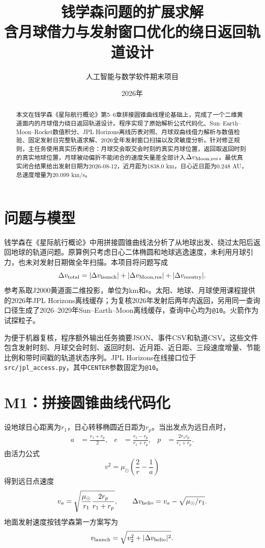 \documentclass[11pt,a4paper]{ctexart}
\title{\heiti 钱学森问题的扩展求解\\
\large 含月球借力与发射窗口优化的绕日返回轨道设计}
\author{人工智能与数学软件期末项目}
\date{2026年}
\begin{document}
\maketitle

\begin{abstract}
本文在钱学森《星际航行概论》第5--6章拼接圆锥曲线理论基础上，完成了一个二维黄道面内的月球借力绕日返回轨道设计。程序实现了原始解析公式代码化、Sun--Earth--Moon--Rocket数值积分、JPL Horizons离线历表对照、月球双曲线借力解析与数值检验、固定发射日完整轨道求解、2026全年发射窗口扫描以及灵敏度分析。针对修正规则，主任务使用真实历表闭合：月球交会取交会时刻的真实月球位置，返回取返回时刻的真实地球位置，月球被动偏折不能闭合的速度矢量差全部计入$\Delta v_{\rm Moon,res}$。最优真实闭合结果给出发射日期为2026-08-12，近月距为1838.0 km，日心近日距为0.248 AU，总速度增量为20.099 km/s。
\end{abstract}

\section{问题与模型}

钱学森在《星际航行概论》中用拼接圆锥曲线法分析了从地球出发、绕过太阳后返回地球的轨道问题\cite{qian2008}。原算例只考虑日心二体椭圆和地球逃逸速度，未利用月球引力，也未对发射日期做全年扫描。本项目将问题写成
\begin{equation}
 \Delta v_{\rm total}=|\Delta v_{\rm launch}|+|\Delta v_{\rm Moon,res}|+|\Delta v_{\rm reentry}|.
\end{equation}
参考系取J2000黄道面二维投影，单位为km和s。太阳、地球、月球使用课程提供的2026年JPL Horizons离线缓存；为复核2026年发射后两年内返回，另用同一查询口径生成了2026--2029年Sun--Earth--Moon离线缓存，查询中心均为\texttt{@10}。火箭作为试探粒子。

为便于机器复核，程序额外输出任务摘要JSON、事件CSV和轨道CSV。这些文件包含发射时刻、月球交会时刻、返回时刻、近月距、近日距、三段速度增量、节能比例和带时间戳的轨道状态序列。JPL Horizons在线接口位于\texttt{src/jpl\_access.py}，其中\texttt{CENTER}参数固定为\texttt{@10}。

\section{M1：拼接圆锥曲线代码化}

设地球日心距离为$r_1$，日心转移椭圆近日距为$r_p$。当出发点为远日点时，
\begin{align}
 a&=\frac{r_1+r_p}{2},&
 e&=\frac{r_1-r_p}{r_1+r_p},&
 p&=\frac{2r_1r_p}{r_1+r_p}.
\end{align}
由活力公式
\begin{equation}
 v^2=\mu_\odot\left(\frac{2}{r}-\frac{1}{a}\right)
\end{equation}
得到远日点速度
\begin{equation}
 v_a=\sqrt{\frac{\mu_\odot}{r_1}\frac{2r_p}{r_1+r_p}},
 \qquad
 \Delta v_{\rm helio}=v_a-\sqrt{\mu_\odot/r_1}.
\end{equation}
地面发射速度按钱学森第一方案写为
\begin{equation}
 v_{\rm launch}=\sqrt{v_2^2+|\Delta v_{\rm helio}|^2}.
\end{equation}
\end{document}
